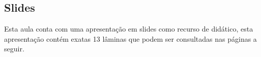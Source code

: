 \documentclass[
12pt,				%
openright,			%
oneside,			%
a4paper,			%
chapter=TITLE,		%
english,			%
brazil				%
]{abntex2}
\begin{document}
% 
\begin{anexosenv}		    
	\chapter{Slides}
	Esta aula conta com uma apresentação em slides como recurso de didático, esta apresentação contém exatas 13 lâminas que podem ser consultadas nas páginas a seguir.
	
\end{anexosenv}
\end{document}

